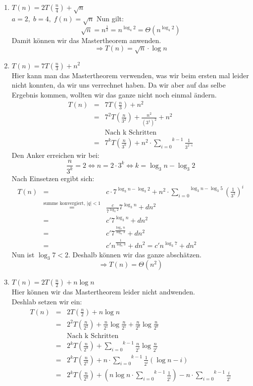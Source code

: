 \documentclass[11pt,a4paper,ngerman]{article}
\begin{document}
\begin{enumerate}[\bfseries (a)]
\item $T(n) =2 T(\frac{n}{4}) + \sqrt{n}$\\
$a= 2 , \; b = 4, \; f(n) = \sqrt{n}$
Nun gilt:
$$
\sqrt{n} = n^{\frac{1}{2}} = n^{\log_4 2} = \Theta (n^{\log_4 2})
$$
Damit können wir das Mastertheorem anwenden.
$$
\Rightarrow T(n) = \sqrt{n} \cdot \log n
$$


\item $T(n) = 7 T(\frac{n}{3}) + n^2$\\
Hier kann man das Mastertheorem verwenden, was wir beim ersten mal leider nicht konnten, da wir uns verrechnet haben. Da wir aber auf das selbe Ergebnis kommen, wollten wir das ganze nicht noch einmal ändern.\\
$$
\begin{array}{rcl}
T(n) &=& 7 T \left( \frac{n}{3} \right) + n^2\\
&=& 7^2 T \left( \frac{n}{3^2} \right) + \frac{n^2}{(3^1)^2} + n^2\\
&& \text{Nach k Schritten}\\
&=& 7^k T \left(\frac{n}{3^k} \right) + n^2 \cdot \overset{k-1}{\underset{i=0}{\sum}} \frac{1}{3^{2\cdot i}}
\end{array}
$$
Den Anker erreichen wir bei:
$$
\frac{n}{3^k} = 2 \Leftrightarrow n = 2 \cdot 3^k \Leftrightarrow k = \log_3 n - \log_3 2
$$
Nach Einsetzen ergibt sich:
$$
\begin{array}{rcl}
T(n) &=& c \cdot 7^{\log_3 n - \log_3 2} + n^2 \cdot \overset{\log_3 n - \log_3 5}{\underset{i=0}{\sum}} \left( \frac{1}{3^{2}} \right) ^ i\\
&\stackrel{\text{summe konvergiert, }|q| < 1}{=}& \frac{c}{7^{\log_3 2}} 7^{\log_3 n} + d n^2\\
&=& c' 7^{\log_3 n} + dn^2\\
&=& c' 7^{\frac{\log_7 n}{\log_7 3}} + dn^2\\
&=& c' n^{\frac{1}{\log_7 3}} + dn^2 = c' n^{\log_3 7} + dn^2
\end{array}
$$
Nun ist $\log_3 7 < 2$. Deshalb können wir das ganze abschätzen.
$$
\Rightarrow T(n) = \Theta(n^2)
$$


\item $T(n) = 2 T(\frac{n}{2}) + n \log n$\\
Hier können wir das Mastertheorem leider nicht andwenden.\\
Deshlab setzen wir ein:
$$
\begin{array}{rcl}
T(n) &=& 2 T(\frac{n}{2}) + n \log n\\
&=& 2^2 T(\frac{n}{2^2}) + \frac{n}{2^1} \log \frac{n}{2^1} + \frac{n}{2^0} \log \frac{n}{2^0}\\
&& \text{Nach k Schritten}\\
&=& 2^k T(\frac{n}{2^k}) + \overset{k-1}{\underset{i=0}{\sum}} \frac{n}{2^i} \log \frac{n}{2^i}\\
&=& 2^k T(\frac{n}{2^k}) + n \cdot \overset{k-1}{\underset{i=0}{\sum}} \frac{1}{2^i} \left( \log n - i \right)\\
&=& 2^k T(\frac{n}{2^k}) + \left( n \log n \cdot \overset{k-1}{\underset{i=0}{\sum}} \frac{1}{2^i} \right) - n \cdot \overset{k-1}{\underset{i=0}{\sum}} \frac{i}{2^i}
\end{array}
$$


\end{enumerate}
\end{document}

